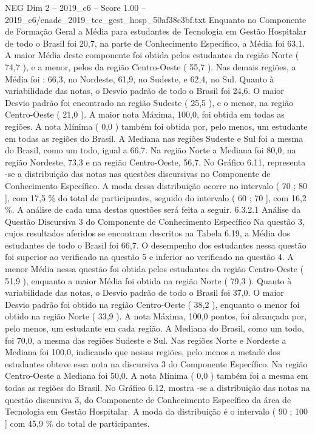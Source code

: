 \begin{textsample}{NEG Dim 2 – 2019\_c6 – Score 1.00 – 2019\_c6/enade\_2019\_tec\_gest\_hosp\_50af38c3bf.txt}
Enquanto no Componente de Formação Geral a Média para estudantes de Tecnologia em Gestão Hospitalar de todo o Brasil foi 20,7, na parte de Conhecimento Específico, a Média foi 63,1.
A maior Média deste componente foi obtida pelos estudantes da região Norte ( 74,7 ), e a menor, pelos da região Centro-Oeste ( 55,7 ).
Nas demais regiões, a Média foi : 66,3, no Nordeste, 61,9, no Sudeste, e 62,4, no Sul.
Quanto à variabilidade das notas, o Desvio padrão de todo o Brasil foi 24,6.
O maior Desvio padrão foi encontrado na região Sudeste ( 25,5 ), e o menor, na região Centro-Oeste ( 21,0 ).
A maior nota Máxima, 100,0, foi obtida em todas as regiões.
A nota Mínima ( 0,0 ) também foi obtida por, pelo menos, um estudante em todas as regiões do Brasil.
A Mediana nas regiões Sudeste e Sul foi a mesma do Brasil, como um todo, igual a 66,7.
Na região Norte a Mediana foi 80,0, na região Nordeste, 73,3 e na região Centro-Oeste, 56,7.
No Gráfico 6.11, representa -se a distribuição das notas nas questões discursivas no Componente de Conhecimento Específico.
A moda dessa distribuição ocorre no intervalo ( 70 ; 80 ], com 17,5 \% do total de participantes, seguido do intervalo ( 60 ; 70 ], com 16,2 \%.
A análise de cada uma destas questões será feita a seguir. 6.3.2.1 Análise da Questão Discursiva 3 do Componente de Conhecimento Específico Na questão 3, cujos resultados aferidos se encontram descritos na Tabela 6.19, a Média dos estudantes de todo o Brasil foi 66,7.
O desempenho dos estudantes nessa questão foi superior ao verificado na questão 5 e inferior ao verificado na questão 4.
A menor Média nessa questão foi obtida pelos estudantes da região Centro-Oeste ( 51,9 ), enquanto a maior Média foi obtida na região Norte ( 79,3 ).
Quanto à variabilidade das notas, o Desvio padrão de todo o Brasil foi 37,0.
O maior Desvio padrão foi obtido na região Centro-Oeste ( 38,2 ), enquanto o menor foi obtido na região Norte ( 33,9 ).
A nota Máxima, 100,0 pontos, foi alcançada por, pelo menos, um estudante em cada região.
A Mediana do Brasil, como um todo, foi 70,0, a mesma das regiões Sudeste e Sul.
Nas regiões Norte e Nordeste a Mediana foi 100,0, indicando que nessas regiões, pelo menos a metade dos estudantes obteve essa nota na discursiva 3 do Componente Específico.
Na região Centro-Oeste a Mediana foi 50,0.
A nota Mínima ( 0,0 ) também foi a mesma em todas as regiões do Brasil.
No Gráfico 6.12, mostra -se a distribuição das notas na questão discursiva 3, do Componente de Conhecimento Específico da área de Tecnologia em Gestão Hospitalar.
A moda da distribuição é o intervalo ( 90 ; 100 ] com 45,9 \% do total de participantes.

\end{textsample}
